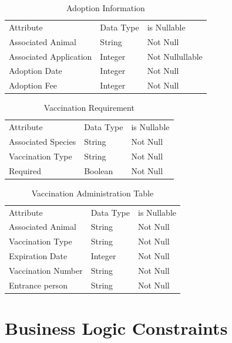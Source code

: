 \documentclass[a4paper]{article}
\begin{document}
\begin{table}[H]
	\centering
	\begin{tabular}{|l|l|l|}
		Attribute     & Data Type & is Nullable \\
		Associated Animal     & String & Not Null \\
		Associated Application     & Integer & Not Nullullable \\
		Adoption Date     & Integer & Not Null \\
		Adoption Fee     & Integer & Not Null \\
	\end{tabular}
	\caption{Adoption Information}
\end{table}

\begin{table}[H]
	\centering
	\begin{tabular}{|l|l|l|}
		Attribute     & Data Type & is Nullable \\
		Associated Species     & String & Not Null \\
		Vaccination Type   & String & Not Null \\
		Required     & Boolean & Not Null \\
	\end{tabular}
	\caption{Vaccination Requirement}
\end{table}

\begin{table}[H]
	\centering
	\begin{tabular}{|l|l|l|}
		Attribute     & Data Type & is Nullable \\
		Associated Animal     & String & Not Null \\
		Vaccination Type   & String & Not Null \\
		Expiration Date     & Integer & Not Null \\
		Vaccination Number    & String & Not Null \\
		Entrance person    & String & Not Null \\

	\end{tabular}
	\caption{Vaccination Administration Table}
\end{table}

\pagebreak

\hypertarget{business_logic_cons}{\section{Business Logic Constraints}}
\end{document}
